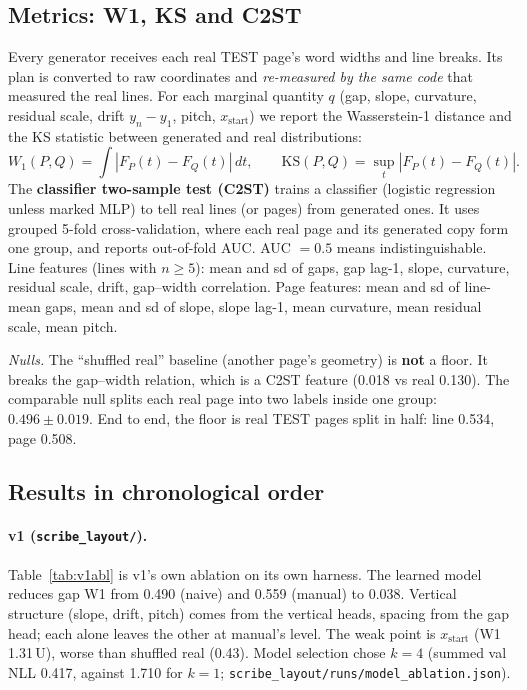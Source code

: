 \documentclass[10.5pt,a4paper]{article}
\newcommand{\fp}[1]{\nolinkurl{#1}}
\newcommand{\U}{\,U}
\begin{document}
\subsection{Metrics: W1, KS and C2ST}
Every generator receives each real TEST page's word widths and line breaks. Its plan is converted to raw coordinates and
\emph{re-measured by the same code} that measured the real lines. For each marginal quantity $q$ (gap, slope, curvature,
residual scale, drift $y_n-y_1$, pitch, $x_\mathrm{start}$) we report the Wasserstein-1 distance and the KS statistic
between generated and real distributions:
\begin{equation}
W_1(P,Q)=\int|F_P(t)-F_Q(t)|\,dt,\qquad \mathrm{KS}(P,Q)=\sup_t|F_P(t)-F_Q(t)|.
\end{equation}
The \textbf{classifier two-sample test (C2ST)} trains a classifier (logistic regression unless marked MLP) to tell real
lines (or pages) from generated ones. It uses grouped 5-fold cross-validation, where each real page and its generated copy
form one group, and reports out-of-fold AUC. AUC $=0.5$ means indistinguishable. Line features (lines with $n\ge5$): mean
and sd of gaps, gap lag-1, slope, curvature, residual scale, drift, gap--width correlation. Page features: mean and sd of
line-mean gaps, mean and sd of slope, slope lag-1, mean curvature, mean residual scale, mean pitch.

\emph{Nulls.} The ``shuffled real'' baseline (another page's geometry) is \textbf{not} a floor. It breaks the gap--width
relation, which is a C2ST feature (0.018 vs real 0.130). The comparable null splits each real page into two labels inside
one group: $0.496\pm0.019$. End to end, the floor is real TEST pages split in half: line 0.534, page 0.508.

\subsection{Results in chronological order}

\paragraph{v1 (\fp{scribe_layout/}).} Table~\ref{tab:v1abl} is v1's own ablation on its own harness. The learned model
reduces gap W1 from 0.490 (naive) and 0.559 (manual) to 0.038. Vertical structure (slope, drift, pitch) comes from the
vertical heads, spacing from the gap head; each alone leaves the other at manual's level. The weak point is
$x_\mathrm{start}$ (W1 1.31\U), worse than shuffled real (0.43). Model selection chose $k=4$ (summed val NLL 0.417, against
1.710 for $k=1$; \fp{scribe_layout/runs/model_ablation.json}).
\end{document}

